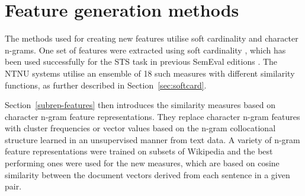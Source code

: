\section{Feature generation methods}
\label{sec:methods}

The methods used for creating new features utilise soft cardinality and character n-grams.
One set of features
were extracted using
soft cardinality \cite{chavez_text_2010}, which has been used successfully for the STS
task in previous SemEval editions \cite{jimenez_soft_2012,jimenez_softcardinality_core:_2013}. 
The NTNU systems utilise an ensemble of 18 such measures with different similarity functions,
as further described in Section~\ref{sec:softcard}.

Section~\ref{subrep-features} then introduces the similarity measures based on character 
n-gram feature representations. 
They replace character n-gram features with cluster frequencies or vector values 
based on the n-gram collocational structure learned in an unsupervised manner from text data. 
A variety of n-gram feature representations were trained on subsets of Wikipedia and the best performing ones 
were used for the new  measures, which are based on cosine similarity between the document vectors 
derived from each sentence in a given pair.


